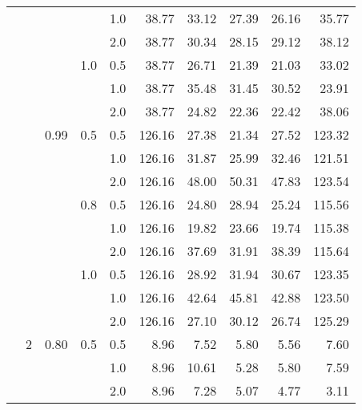 \documentclass{article}
\begin{document}
{\begin{tabular}{lllllrrrrr}
            &     &      &     & 1.0 &   38.77 &   33.12 &             27.39 &                26.16 &      35.77 \\
            &     &      &     & 2.0 &   38.77 &   30.34 &             28.15 &                29.12 &      38.12 \\
            &     &      & 1.0 & 0.5 &   38.77 &   26.71 &             21.39 &                21.03 &      33.02 \\
            &     &      &     & 1.0 &   38.77 &   35.48 &             31.45 &                30.52 &      23.91 \\
            &     &      &     & 2.0 &   38.77 &   24.82 &             22.36 &                22.42 &      38.06 \\
            &     & 0.99 & 0.5 & 0.5 &  126.16 &   27.38 &             21.34 &                27.52 &     123.32 \\
            &     &      &     & 1.0 &  126.16 &   31.87 &             25.99 &                32.46 &     121.51 \\
            &     &      &     & 2.0 &  126.16 &   48.00 &             50.31 &                47.83 &     123.54 \\
            &     &      & 0.8 & 0.5 &  126.16 &   24.80 &             28.94 &                25.24 &     115.56 \\
            &     &      &     & 1.0 &  126.16 &   19.82 &             23.66 &                19.74 &     115.38 \\
            &     &      &     & 2.0 &  126.16 &   37.69 &             31.91 &                38.39 &     115.64 \\
            &     &      & 1.0 & 0.5 &  126.16 &   28.92 &             31.94 &                30.67 &     123.35 \\
            &     &      &     & 1.0 &  126.16 &   42.64 &             45.81 &                42.88 &     123.50 \\
            &     &      &     & 2.0 &  126.16 &   27.10 &             30.12 &                26.74 &     125.29 \\
            & 2 & 0.80 & 0.5 & 0.5 &    8.96 &    7.52 &              5.80 &                 5.56 &       7.60 \\
            &     &      &     & 1.0 &    8.96 &   10.61 &              5.28 &                 5.80 &       7.59 \\
            &     &      &     & 2.0 &    8.96 &    7.28 &              5.07 &                 4.77 &       3.11 \\

\end{tabular}}
\end{document}
